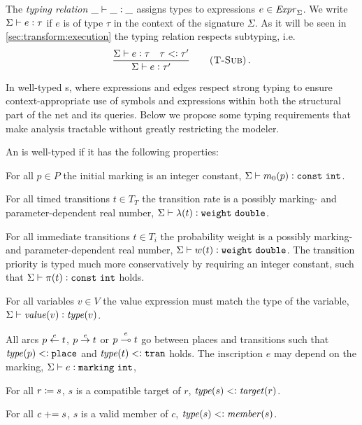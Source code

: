 The \emph{typing relation} \({\_} \vdash {\_} \mathrel{\vcentcolon} {\_}\) assigns types to expressions \(e \in \textrm{\itshape Expr\/}_\Sigma\). We write \(\Sigma \vdash e \mathrel{\vcentcolon} \tau\) if \(e\) is of type \(\tau\) in the context of the  signature \(\Sigma\). As it will be seen in \vref{sec:transform:execution} the typing relation respects subtyping, i.e.
\begin{equation}
  \frac{\Sigma \vdash e \oftype \tau \quad \tau \subtype \tau'}{%
    \Sigma \vdash e \oftype \tau'} \Tag{T-Sub} \,\text.
\end{equation}

In well-typed s, where expressions and edges respect strong typing to ensure context-appropriate use of symbols and expressions within both the structural part of the net and its queries. Below we propose some typing requirements that make analysis tractable without greatly restricting the modeler.

\begin{dfn}\label{dfn:rgspn:well-typed}
  An  is well-typed if it has the following properties:
  \begin{compactitem}
  \item For all \(p \in P\) the initial marking is an integer constant, \(\Sigma \vdash m_0(p) \mathrel{\vcentcolon} \texttt{\upshape const}\ \texttt{\upshape int}\).
  \item For all timed transitions \(t \in T_T\) the transition rate is a possibly marking- and parameter-dependent real number, \(\Sigma \vdash \lambda(t) \mathrel{\vcentcolon} \texttt{\upshape weight}\ \texttt{\upshape double}\).
  \item For all immediate transitions \(t \in T_i\) the probability weight is a possibly marking- and parameter-dependent real number, \(\Sigma \vdash w(t) \mathrel{\vcentcolon} \texttt{\upshape weight}\ \texttt{\upshape double}\). The transition priority is typed much more conservatively by requiring an integer constant, such that \(\Sigma \vdash \pi(t) \mathrel{\vcentcolon} \texttt{\upshape const}\ \texttt{\upshape int}\) holds.
  \item For all variables \(v \in V\) the value expression must match the type of the variable, \(\Sigma \vdash \textrm{\itshape value\/}(v) \mathrel{\vcentcolon} \textrm{\itshape type\/}(v)\).
  \item All arcs \(p \overset{e}{\leftarrow} t\), \(p \overset{e}{\rightarrow} t\) or \(p \overset{e}{\multimap} t\) go between places and transitions such that \(\textrm{\itshape type\/}(p) \mathrel{<\vcentcolon} \texttt{\upshape place}\) and \(\textrm{\itshape type\/}(t) \mathrel{<\vcentcolon} \texttt{\upshape tran}\) holds. The inscription \(e\) may depend on the marking, \(\Sigma \vdash e \mathrel{\vcentcolon} \texttt{\upshape marking}\ \texttt{\upshape int}\),
  \item For all \(r \coloneq s\), \(s\) is a compatible target of \(r\), \(\textrm{\itshape type\/}(s) \mathrel{<\vcentcolon} \textrm{\itshape target\/}(r)\).
  \item For all \(c \mathrel{{+}{=}} s\), \(s\) is a valid member of \(c\), \(\textrm{\itshape type\/}(s) \mathrel{<\vcentcolon} \textrm{\itshape member\/}(s)\).
  \end{compactitem}
\end{dfn}

